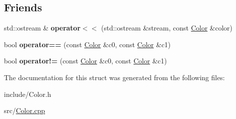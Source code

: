 \subsection*{Friends}
\begin{DoxyCompactItemize}
\item 
\mbox{\label{structmonsterbattle_1_1Color_a2949bc642f18dffe591014eca1260be5}} 
std\+::ostream \& {\bfseries operator$<$$<$} (std\+::ostream \&stream, const \hyperlink{structmonsterbattle_1_1Color}{Color} \&color)
\item 
\mbox{\label{structmonsterbattle_1_1Color_a2a8772544f6d9345a67d6b4497244a1d}} 
bool {\bfseries operator==} (const \hyperlink{structmonsterbattle_1_1Color}{Color} \&c0, const \hyperlink{structmonsterbattle_1_1Color}{Color} \&c1)
\item 
\mbox{\label{structmonsterbattle_1_1Color_a71784542dfc75219a40ce39c18d2da7d}} 
bool {\bfseries operator!=} (const \hyperlink{structmonsterbattle_1_1Color}{Color} \&c0, const \hyperlink{structmonsterbattle_1_1Color}{Color} \&c1)
\end{DoxyCompactItemize}


The documentation for this struct was generated from the following files\+:\begin{DoxyCompactItemize}
\item 
include/Color.\+h\item 
src/\hyperlink{Color_8cpp}{Color.\+cpp}\end{DoxyCompactItemize}
